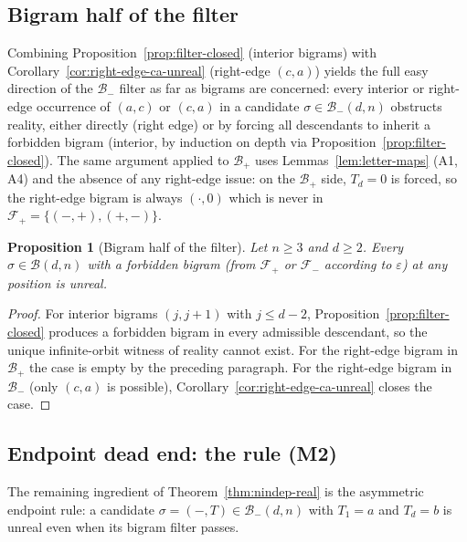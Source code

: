 \documentclass{amsart}
\newtheorem{proposition}[theorem]{Proposition}
\theoremstyle{definition}
\theoremstyle{remark}
\begin{document}
\subsection{Bigram half of the filter}
\label{ssec:gap}

Combining Proposition~\ref{prop:filter-closed} \textup{(}interior
bigrams\textup{)} with Corollary~\ref{cor:right-edge-ca-unreal}
\textup{(}right-edge $(c, a)$\textup{)} yields the full easy
direction of the $\mathcal{B}_-$ filter as far as bigrams are
concerned: every interior or right-edge occurrence of $(a, c)$ or
$(c, a)$ in a candidate $\sigma \in \mathcal{B}_-(d, n)$ obstructs
reality, either directly \textup{(}right edge\textup{)} or by
forcing all descendants to inherit a forbidden bigram
\textup{(}interior, by induction on depth via
Proposition~\ref{prop:filter-closed}\textup{)}.  The same argument
applied to $\mathcal{B}_+$ uses Lemmas~\ref{lem:letter-maps}
\textup{(}A1, A4\textup{)} and the absence of any right-edge issue:
on the $\mathcal{B}_+$ side, $T_d = 0$ is forced, so the
right-edge bigram is always $(\cdot, 0)$ which is never in
$\mathcal{F}_+ = \{(-, +), (+, -)\}$.

\begin{proposition}[Bigram half of the filter]
\label{prop:bigram-half}
Let $n \ge 3$ and $d \ge 2$.  Every $\sigma \in \mathcal{B}(d, n)$
with a forbidden bigram \textup{(}from $\mathcal{F}_+$ or
$\mathcal{F}_-$ according to $\varepsilon$\textup{)} at any
position is unreal.
\end{proposition}

\begin{proof}
For interior bigrams $(j, j+1)$ with $j \le d - 2$,
Proposition~\ref{prop:filter-closed} produces a forbidden bigram in
every admissible descendant, so the unique infinite-orbit witness
of reality cannot exist.  For the right-edge bigram in
$\mathcal{B}_+$ the case is empty by the preceding paragraph.  For
the right-edge bigram in $\mathcal{B}_-$ \textup{(}only $(c, a)$ is
possible\textup{)}, Corollary~\ref{cor:right-edge-ca-unreal} closes
the case.
\end{proof}

\subsection{Endpoint dead end: the rule (M2)}
\label{ssec:m2}

The remaining ingredient of
Theorem~\ref{thm:nindep-real} is the asymmetric endpoint
rule: a candidate $\sigma = (-, T) \in \mathcal{B}_-(d, n)$ with
$T_1 = a$ and $T_d = b$ is unreal even when its bigram filter
passes.
\end{document}
